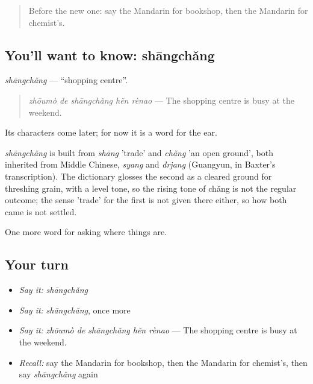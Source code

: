 \label{lesson:ZH-C190-shangchang}



\begin{quote}
Before the new one: say the Mandarin for bookshop, then the Mandarin for chemist's.
\end{quote}

\subsection*{You'll want to know: shāngchǎng}
\emph{shāngchǎng} — \textquotedblleft{}shopping centre\textquotedblright{}.

\begin{quote}
\emph{zhōumò de shāngchǎng hěn rènao} — The shopping centre is busy at the weekend.
\end{quote}

Its characters come later; for now it is a word for the ear.

\begin{cousinweb}
\emph{shāngchǎng} is built from \emph{shāng} 'trade' and \emph{chǎng} 'an open ground', both inherited from Middle Chinese, \emph{syang} and \emph{drjang} (Guangyun, in Baxter's transcription). The dictionary glosses the second as a cleared ground for threshing grain, with a level tone, so the rising tone of chǎng is not the regular outcome; the sense 'trade' for the first is not given there either, so how both came is not settled.
\end{cousinweb}

\begin{grammarlens}[title={What you've built}]
One more word for asking where things are.
\end{grammarlens}

\subsection*{Your turn}
\begin{itemize}
\raggedright
  \item \emph{Say it:} \emph{shāngchǎng}
  \item \emph{Say it:} \emph{shāngchǎng}, once more
  \item \emph{Say it:} \emph{zhōumò de shāngchǎng hěn rènao} — The shopping centre is busy at the weekend.
  \item \emph{Recall:} say the Mandarin for bookshop, then the Mandarin for chemist's, then say \emph{shāngchǎng} again
\end{itemize}

